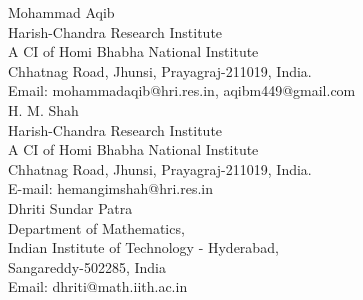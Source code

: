 \documentclass[a4paper, twoside, 10pt]{article}
\numberwithin{equation}{section}
\theoremstyle{definition}
\begin{document}









        \noindent Mohammad Aqib\\
	Harish-Chandra Research Institute\\ 
	A CI of Homi Bhabha National Institute\\ 
	Chhatnag Road, Jhunsi, Prayagraj-211019, India.\\	
	Email: mohammadaqib@hri.res.in, aqibm449@gmail.com\\

 
	\noindent H. M. Shah\\
	Harish-Chandra Research Institute\\ 
	A CI of Homi Bhabha National Institute\\ 
	Chhatnag Road, Jhunsi, Prayagraj-211019, India.\\	
	E-mail:	hemangimshah@hri.res.in\\


        \noindent Dhriti Sundar Patra\\
	Department of Mathematics,\\ 
        Indian Institute of Technology - Hyderabad,\\ 
        Sangareddy-502285, India\\
        Email: dhriti@math.iith.ac.in\\
 
	
	
\end{document}
